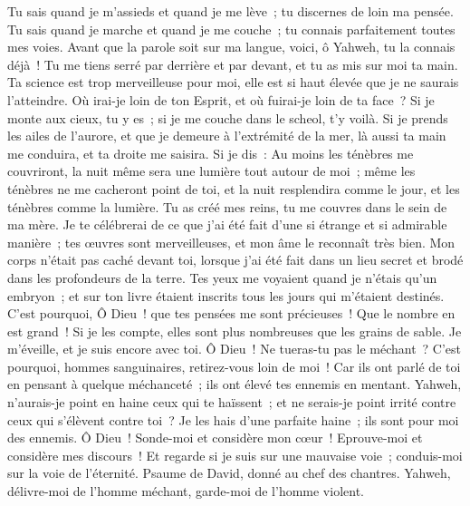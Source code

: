 \begin{multicols}{2}
Tu sais quand je m'assieds et quand je me lève~; tu discernes de loin ma pensée.
Tu sais quand je marche et quand je me couche~; tu connais parfaitement toutes mes voies.
Avant que la parole soit sur ma langue, voici, ô Yahweh, tu la connais déjà~!
Tu me tiens serré par derrière et par devant, et tu as mis sur moi ta main. 
Ta science est trop merveilleuse pour moi, elle est si haut élevée que je ne saurais l'atteindre.
Où irai-je loin de ton Esprit, et où fuirai-je loin de ta face~?
Si je monte aux cieux, tu y es~; si je me couche dans le scheol, t'y voilà.
Si je prends les ailes de l'aurore, et que je demeure à l'extrémité de la mer,
là aussi ta main me conduira, et ta droite me saisira.
Si je dis~: Au moins les ténèbres me couvriront, la nuit même sera une lumière tout autour de moi~;
même les ténèbres ne me cacheront point de toi, et la nuit resplendira comme le jour, et les ténèbres comme la lumière.
Tu as créé mes reins, tu me couvres dans le sein de ma mère.
Je te célébrerai de ce que j'ai été fait d'une si étrange et si admirable manière~; tes œuvres sont merveilleuses, et mon âme le reconnaît très bien.
Mon corps n'était pas caché devant toi, lorsque j'ai été fait dans un lieu secret et brodé dans les profondeurs de la terre.
Tes yeux me voyaient quand je n'étais qu'un embryon~; et sur ton livre étaient inscrits tous les jours qui m'étaient destinés.
C'est pourquoi, Ô Dieu~! que tes pensées me sont précieuses~! Que le nombre en est grand~!
Si je les compte, elles sont plus nombreuses que les grains de sable. Je m'éveille, et je suis encore avec toi.
Ô Dieu~! Ne tueras-tu pas le méchant~? C'est pourquoi, hommes sanguinaires, retirez-vous loin de moi~!
Car ils ont parlé de toi en pensant à quelque méchanceté~; ils ont élevé tes ennemis en mentant.
Yahweh, n'aurais-je point en haine ceux qui te haïssent~; et ne serais-je point irrité contre ceux qui s'élèvent contre toi~?
Je les hais d'une parfaite haine~; ils sont pour moi des ennemis.
Ô Dieu~! Sonde-moi et considère mon cœur~! Eprouve-moi et considère mes discours~!
Et regarde si je suis sur une mauvaise voie~; conduis-moi sur la voie de l'éternité.
\VerseOne{}Psaume de David, donné au chef des chantres. Yahweh, délivre-moi de l'homme méchant, garde-moi de l'homme violent.

\end{multicols}

